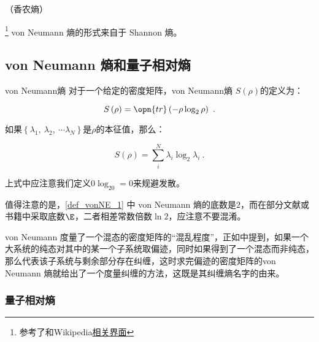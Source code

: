 
\begin{issues}
\issueTODO
\issueMissDepend（香农熵）
\end{issues}


\footnote{参考了\cite{量子信息}和Wikipedia\href{https://en.wikipedia.org/wiki/Von_Neumann_entropy}{相关界面}}
von Neumann 熵的形式来自于 Shannon 熵。

\subsection{von Neumann 熵和量子相对熵}

\begin{definition}{von Neumann熵}\label{def_vonNE_1}
对于一个给定的密度矩阵，von Neumann熵 $S\left(\rho\right)$的定义为：

\begin{equation}
S\left( \rho \right) = \opn{tr}\left( - \rho \log_2 \rho \right)~.
\end{equation}

如果$\left\{ \lambda_1,~\lambda_2,~\cdots \lambda_N \right\}$是$\rho$的本征值，那么：

\begin{equation}
S\left(\rho\right) = \sum_i^N \lambda_i \log_2 \lambda_i~.
\end{equation}

上式中应注意我们定义$0\log_20 = 0$来规避发散。

\end{definition}

值得注意的是，\autoref{def_vonNE_1} 中 von Neumann 熵的底数是$2$，而在部分文献或书籍中采取底数$\E$，二者相差常数倍数$\ln 2$，应注意不要混淆。

von Neumann 度量了一个混态的密度矩阵的“混乱程度”，正如中提到，如果一个大系统的纯态对其中的某一个子系统取偏迹，同时如果得到了一个混态而非纯态，那么代表该子系统与剩余部分存在纠缠，这时求完偏迹的密度矩阵的von Neumann 熵就给出了一个度量纠缠的方法，这既是其纠缠熵名字的由来。

\subsubsection{量子相对熵}

